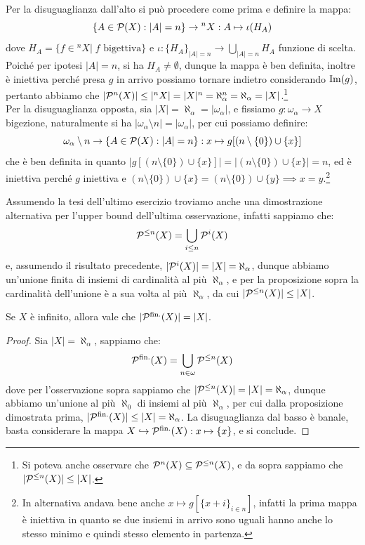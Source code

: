 \begin{soln}
	Per la disuguaglianza dall'alto si può procedere come prima e definire la mappa:
	\[ \{A \in \mathcal{P}(X) : |A| = n\} \to {}^n X : A \mapsto \iota(H_A)
		\]
	dove $H_A = \{f \in {}^n X | \; \text{$f$ bigettiva}\}$ e $\iota : \{H_A\}_{|A| = n} \to \bigcup_{|A| = n} H_A$ funzione di scelta. Poiché per ipotesi $|A| = n$, si ha $H_A \ne \emptyset$, dunque la mappa è ben definita, inoltre è iniettiva perché presa $g$ in arrivo
	possiamo tornare indietro considerando $\operatorname{Im}(g)$, pertanto abbiamo che $|\mathcal{P}^n(X)| \leq |{}^n X| = |X|^n = \aleph_\alpha^n = \aleph_\alpha = |X|$.\footnote{Si poteva anche osservare che $\mathcal{P}^n(X) \subseteq \mathcal{P}^{\leq n}(X)$, e da sopra sappiamo che $|\mathcal{P}^{\leq n}(X)| \leq |X|$.}\\
	Per la disuguaglianza opposta, sia $|X| = \aleph_\alpha = |\omega_\alpha|$, e fissiamo $g : \omega_\alpha \to X$ bigezione, naturalmente si ha $|\omega_\alpha \setminus n| = |\omega_\alpha|$, per cui possiamo definire:
	\[ \omega_\alpha \setminus n \to \{A \in \mathcal{P}(X) : |A| = n\} : x \mapsto g[(n \setminus \{0\}) \cup \{x\}]
		\]
	che è ben definita in quanto $|g[(n \setminus \{0\}) \cup \{x\}]| = |(n \setminus \{0\}) \cup \{x\}| = n$, ed è iniettiva perché $g$ iniettiva e $(n \setminus \{0\}) \cup \{x\} = (n \setminus \{0\}) \cup \{y\} \implies x = y$.\footnote{In alternativa andava bene anche $x \mapsto g[\{x + i\}_{i \in n}]$, infatti la prima mappa è iniettiva in quanto se due 
	insiemi in arrivo sono uguali hanno anche lo stesso minimo e quindi stesso elemento in partenza.}
\end{soln}

\begin{remark}
	Assumendo la tesi dell'ultimo esercizio troviamo anche una dimostrazione alternativa per l'upper bound dell'ultima osservazione, infatti sappiamo che:
	\[ \mathcal{P}^{\leq n}(X) = \bigcup_{i \leq n}\mathcal{P}^i(X)
		\]
	e, assumendo il risultato precedente, $|\mathcal{P}^i(X)| = |X| = \aleph_\alpha$, dunque abbiamo un'unione finita di insiemi di cardinalità al più $\aleph_\alpha$, e per la proposizione sopra la cardinalità dell'unione è a sua 
	volta al più $\aleph_\alpha$, da cui $|\mathcal{P}^{\leq n}(X)| \leq |X|$.
\end{remark}

\begin{proposition}[$|\psf(X)| = |X|$]
	\label{parti_finite_generale}
	Se $X$ è infinito, allora vale che $|\psf(X)| = |X|$.
\end{proposition}

\begin{proof}
	Sia $|X| = \aleph_\alpha$, sappiamo che:
	\[ \mathcal{P}^{\text{fin.}}(X) = \bigcup_{n \in \omega} \mathcal{P}^{\leq n}(X)
		\]
	dove per l'osservazione sopra sappiamo che $|\mathcal{P}^{\leq n}(X)| = |X| = \aleph_\alpha$, dunque abbiamo un'unione al più $\aleph_0$ di insiemi al più $\aleph_\alpha$, per cui dalla proposizione dimostrata prima,
	$|\mathcal{P}^{\text{fin.}}(X)| \leq |X| = \aleph_\alpha$. La disuguaglianza dal basso è banale, basta considerare la mappa $X \hookrightarrow \mathcal{P}^{\text{fin.}}(X) : x \mapsto \{x\}$, e si conclude.
\end{proof}


